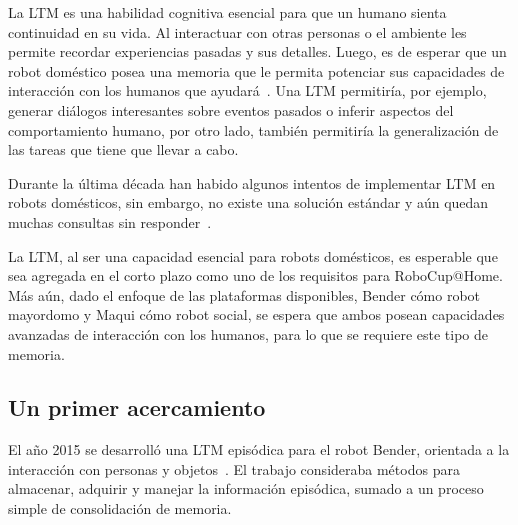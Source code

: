 La LTM es una habilidad cognitiva esencial para que un humano sienta continuidad en su vida. Al interactuar con otras personas o el ambiente les permite recordar experiencias pasadas y sus detalles. Luego, es de esperar que un robot doméstico posea una memoria que le permita potenciar sus capacidades de interacción con los humanos que ayudará~\cite{Vijayakumar2014}. Una LTM permitiría, por ejemplo, generar diálogos interesantes sobre eventos pasados o inferir aspectos del comportamiento humano, por otro lado, también permitiría la generalización de las tareas que tiene que llevar a cabo.

Durante la última década han habido algunos intentos de implementar LTM en robots domésticos, sin embargo, no existe una solución estándar y aún quedan muchas consultas sin responder~\cite{ltm_in_robocup}.

La LTM, al ser una capacidad esencial para robots domésticos, es esperable que sea agregada en el corto plazo como uno de los requisitos para RoboCup@Home. Más aún, dado el enfoque de las plataformas disponibles, Bender cómo robot mayordomo y Maqui cómo robot social, se espera que ambos posean capacidades avanzadas de interacción con los humanos, para lo que se requiere este tipo de memoria.


\subsection{Un primer acercamiento}\label{sec:primer_acercamiento}

El año 2015 se desarrolló una LTM episódica para el robot Bender, orientada a la interacción con personas y objetos~\cite{Sanchez:2015}. El trabajo consideraba métodos para almacenar, adquirir y manejar la información episódica, sumado a un proceso simple de consolidación de memoria.

